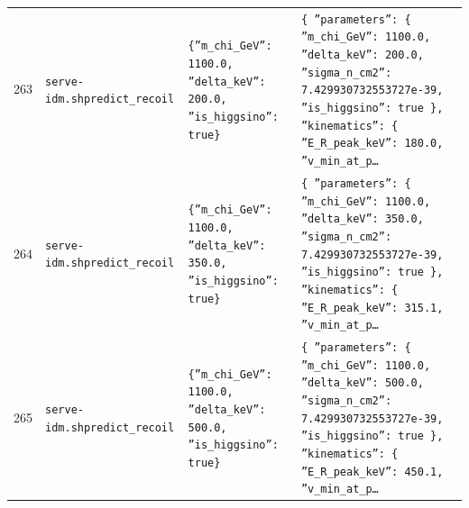 \documentclass[11pt,a4paper]{article}
\begin{document}
\begin{longtable}{@{}p{}p{}p{}p{}@{}}
263 & \texttt{serve-idm.sh}\newline\texttt{predict\_\allowbreak{}recoil} & \texttt{\{''m\_\allowbreak{}chi\_\allowbreak{}GeV'':\allowbreak{} 1100.0,\allowbreak{} ''delta\_\allowbreak{}keV'':\allowbreak{} 200.0,\allowbreak{} ''is\_\allowbreak{}higgsino'':\allowbreak{} true\}\allowbreak{}} & \texttt{\{   ''parameters'':\allowbreak{} \{     ''m\_\allowbreak{}chi\_\allowbreak{}GeV'':\allowbreak{} 1100.0,\allowbreak{}     ''delta\_\allowbreak{}keV'':\allowbreak{} 200.0,\allowbreak{}     ''sigma\_\allowbreak{}n\_\allowbreak{}cm2'':\allowbreak{} 7.429930732553727e-39,\allowbreak{}     ''is\_\allowbreak{}higgsino'':\allowbreak{} true   \}\allowbreak{},\allowbreak{}   ''kinematics'':\allowbreak{} \{     ''E\_\allowbreak{}R\_\allowbreak{}peak\_\allowbreak{}keV'':\allowbreak{} 180.0,\allowbreak{}     ''v\_\allowbreak{}min\_\allowbreak{}at\_\allowbreak{}p\ldots{}\allowbreak{}} \\
264 & \texttt{serve-idm.sh}\newline\texttt{predict\_\allowbreak{}recoil} & \texttt{\{''m\_\allowbreak{}chi\_\allowbreak{}GeV'':\allowbreak{} 1100.0,\allowbreak{} ''delta\_\allowbreak{}keV'':\allowbreak{} 350.0,\allowbreak{} ''is\_\allowbreak{}higgsino'':\allowbreak{} true\}\allowbreak{}} & \texttt{\{   ''parameters'':\allowbreak{} \{     ''m\_\allowbreak{}chi\_\allowbreak{}GeV'':\allowbreak{} 1100.0,\allowbreak{}     ''delta\_\allowbreak{}keV'':\allowbreak{} 350.0,\allowbreak{}     ''sigma\_\allowbreak{}n\_\allowbreak{}cm2'':\allowbreak{} 7.429930732553727e-39,\allowbreak{}     ''is\_\allowbreak{}higgsino'':\allowbreak{} true   \}\allowbreak{},\allowbreak{}   ''kinematics'':\allowbreak{} \{     ''E\_\allowbreak{}R\_\allowbreak{}peak\_\allowbreak{}keV'':\allowbreak{} 315.1,\allowbreak{}     ''v\_\allowbreak{}min\_\allowbreak{}at\_\allowbreak{}p\ldots{}\allowbreak{}} \\
265 & \texttt{serve-idm.sh}\newline\texttt{predict\_\allowbreak{}recoil} & \texttt{\{''m\_\allowbreak{}chi\_\allowbreak{}GeV'':\allowbreak{} 1100.0,\allowbreak{} ''delta\_\allowbreak{}keV'':\allowbreak{} 500.0,\allowbreak{} ''is\_\allowbreak{}higgsino'':\allowbreak{} true\}\allowbreak{}} & \texttt{\{   ''parameters'':\allowbreak{} \{     ''m\_\allowbreak{}chi\_\allowbreak{}GeV'':\allowbreak{} 1100.0,\allowbreak{}     ''delta\_\allowbreak{}keV'':\allowbreak{} 500.0,\allowbreak{}     ''sigma\_\allowbreak{}n\_\allowbreak{}cm2'':\allowbreak{} 7.429930732553727e-39,\allowbreak{}     ''is\_\allowbreak{}higgsino'':\allowbreak{} true   \}\allowbreak{},\allowbreak{}   ''kinematics'':\allowbreak{} \{     ''E\_\allowbreak{}R\_\allowbreak{}peak\_\allowbreak{}keV'':\allowbreak{} 450.1,\allowbreak{}     ''v\_\allowbreak{}min\_\allowbreak{}at\_\allowbreak{}p\ldots{}\allowbreak{}} \\

\end{longtable}
\end{document}
